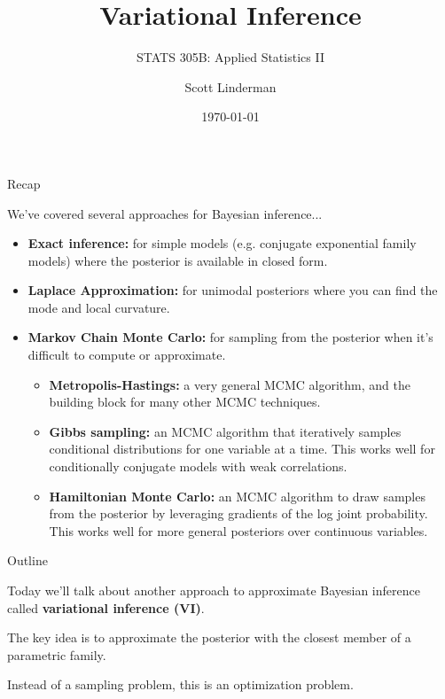\documentclass[aspectratio=169]{beamer}
\title{Variational Inference}
\subtitle{STATS 305B: Applied Statistics II}
\author{Scott Linderman}
\date{\today}
\begin{document}
\maketitle


\begin{frame}{Recap}

We've covered several approaches for Bayesian inference...
\begin{itemize}
    \item \textbf{Exact inference:} for simple models (e.g. conjugate exponential family models) where the posterior is available in closed form.
    \item \textbf{Laplace Approximation:} for unimodal posteriors where you can find the mode and local curvature.  
    \item \textbf{Markov Chain Monte Carlo:} for sampling from the posterior when it's difficult to compute or approximate.
    \begin{itemize}
        \item \textbf{Metropolis-Hastings: } a very general MCMC algorithm, and the building block for many other MCMC techniques.
        \item \textbf{Gibbs sampling:} an MCMC algorithm that iteratively samples conditional distributions for one variable at a time. This works well for conditionally conjugate models with weak correlations.
        \item \textbf{Hamiltonian Monte Carlo: } an MCMC algorithm to draw samples from the posterior by leveraging gradients of the log joint probability. This works well for more general posteriors over continuous variables.
    \end{itemize}
\end{itemize}

\end{frame}


\begin{frame}{Outline}

    Today we'll talk about another approach to approximate Bayesian inference called \textbf{variational inference (VI)}.
    
    The key idea is to approximate the posterior with the closest member of a parametric family. 

    Instead of a sampling problem, this is an optimization problem.
    
\end{frame}
\end{document}
